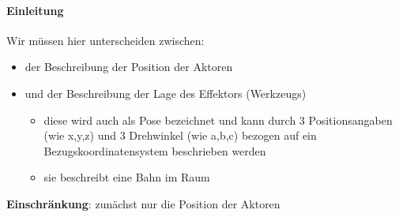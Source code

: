 %
%
%
%




{ 
	
	\framesubtitle{Einleitung}	
	
	\begin{figure}[!h]
		\centering
		
	\end{figure}
	
	Wir müssen hier unterscheiden zwischen:
	
	\begin{itemize}
		\item der Beschreibung der Position der Aktoren
		\item und der Beschreibung der Lage des Effektors (Werkzeugs)
		\begin{itemize}
			\item diese wird auch als Pose bezeichnet und kann durch 3 Positionsangaben (wie x,y,z) und 3 Drehwinkel (wie a,b,c) bezogen auf ein Bezugskoordinatensystem beschrieben werden
			\item sie beschreibt eine Bahn im Raum
		\end{itemize}
	\end{itemize}
	
	\textbf{Einschränkung}: zunächst nur die Position der Aktoren
}


